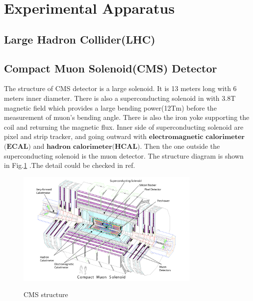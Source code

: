 

\clearpage
\section{Experimental Apparatus}
\label{sec:ExperimentalAppratus}

	\subsection{Large Hadron Collider(LHC)}
	\label{ssec:ExpApp_LHC}

	\subsection{Compact Muon Solenoid(CMS) Detector}
	\label{ssec:ExpApp_CMS}

		The structure of CMS detector is a large solenoid. It is 13 meters long with 6 meters inner diameter. There is also a superconducting solenoid in with 3.8T magnetic field which provides a large bending power(12Tm) before the measurement of muon's bending angle. There is also the iron yoke supporting the coil and returning the magnetic flux. Inner side of superconducting solenoid are pixel and strip tracker, and going outward with $\textbf{electromagnetic}$ $\textbf{calorimeter}$$\textbf{(ECAL)}$ and $\textbf{hadron}$ $\textbf{calorimeter}$$\textbf{(HCAL)}$. Then the one outside the superconducting solenoid is the muon detector. The structure diagram is shown in Fig.\ref{ExpApp:fig:CMS_structure} .The detail could be checked in ref.\cite{Chatrchyan:2008aa}

		\begin{figure}[H]
		\centering{}
	    	\includegraphics[width=0.8\textwidth]{Figures/ExpApparatus/CMS_detector.png}\\
		\caption{CMS structure\cite{Chatrchyan:2008aa}}
		\label{ExpApp:fig:CMS_structure}
		\end{figure}
		\FloatBarrier

